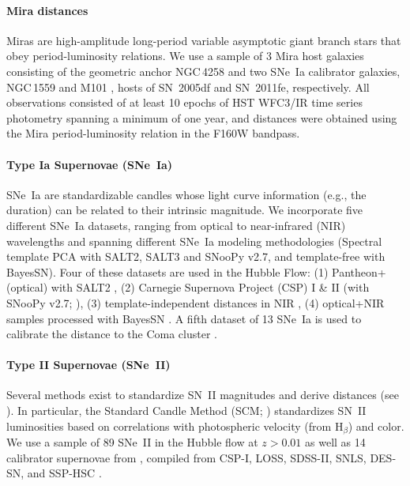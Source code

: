 \paragraph{Mira distances}
Miras are high-amplitude long-period variable asymptotic giant branch stars that obey period-luminosity relations.
We use a sample of 3 Mira host galaxies consisting of the geometric anchor NGC$\,$4258 \citep{2018ApJ...857...67H} and two SNe~Ia calibrator galaxies, NGC$\,$1559 and M101 \citep{2020ApJ...889....5H, 2024ApJ...963...83H}, hosts of SN~2005df and SN~2011fe, respectively. All observations consisted of at least 10 epochs of HST WFC3/IR time series photometry spanning a minimum of one year, and distances were obtained using the Mira period-luminosity relation in the {F160W} bandpass. 


\paragraph{\textbf{Type Ia Supernovae (SNe~Ia)}}
SNe~Ia are standardizable candles whose light curve information (e.g., the duration) can be related to their intrinsic magnitude.
We incorporate five different SNe~Ia datasets, ranging from optical to near-infrared (NIR) wavelengths and spanning different SNe~Ia modeling methodologies (Spectral template PCA with SALT2, SALT3 and SNooPy v2.7, and template-free with BayesSN). Four of these datasets are used in the Hubble Flow: (1) Pantheon+ (optical) with SALT2 \citep{2022ApJ...938..113S,2022ApJ...938..111B}, (2) Carnegie Supernova Project (CSP) I \& II (with SNooPy v2.7; \citealt{2011AJ....141...19B,2024ApJ...970...72U}), (3) template-independent distances in NIR \citep{2023AA...679A..95G}, (4) optical+NIR samples processed with BayesSN \citep{2023MNRAS.524..235D}. A fifth dataset of 13 SNe~Ia is used to calibrate the distance to the Coma cluster \citep{2025ApJ...979L...9S}. %

\paragraph{Type II Supernovae (SNe~II)}
Several methods exist to standardize SN~II magnitudes and derive distances (see \citealt{2024hct..book..177D}). In particular, the Standard Candle Method (SCM; \citealt{2002ApJ...566L..63H}) standardizes SN~II luminosities based on correlations with photospheric velocity (from H$_\beta$) and color.
We use a sample of 89 SNe~II in the Hubble flow at $z > 0.01$ as well as 14 calibrator supernovae from \citet{2020MNRAS.495.4860D,2022MNRAS.514.4620D}, compiled from CSP-I, LOSS, SDSS-II, SNLS, DES-SN, and SSP-HSC \citep{2017ApJ...835..166D,2017MNRAS.472.4233D,2020MNRAS.495.4860D}.

